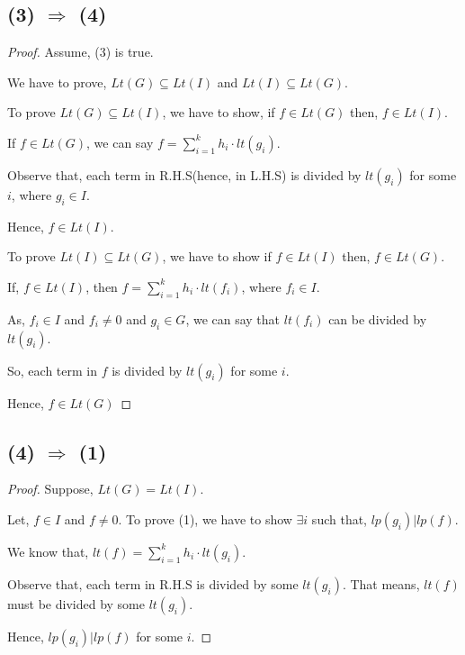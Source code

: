 \subsection{(3) $\Longrightarrow$ (4)}
\begin{proof}
Assume, (3) is true.

We have to prove, $Lt(G) \subseteq Lt(I)$ and $Lt(I) \subseteq Lt(G)$.

To prove $Lt(G) \subseteq Lt(I)$, we have to show, if $f \in Lt(G)$ then, $f \in Lt(I)$.

If $f \in Lt(G)$, we can say $f = \sum_{i =1}^{k} h_i \cdot lt(g_i)$.

Observe that, each term in R.H.S(hence, in L.H.S) is divided by $lt(g_i)$ for some $i$, where $g_i \in I$.

Hence, $f \in Lt(I)$.

To prove $Lt(I) \subseteq Lt(G)$, we have to show if $f \in Lt(I)$ then, $f \in Lt(G)$.

If, $f \in Lt(I)$, then $f = \sum_{i =1}^{k} h_i \cdot lt(f_i)$, where $f_i \in I$.

As, $f_i \in I$ and $f_i \neq 0$ and $g_i \in G$, we can say that $lt(f_i)$ can be divided by $lt(g_i)$.

So, each term in $f$ is divided by $lt(g_i)$ for some $i$.

Hence, $f \in Lt(G)$

\end{proof}

\subsection{(4) $\Longrightarrow$ (1)}
\begin{proof}

Suppose, $Lt(G) = Lt(I)$.

Let, $f \in I$ and $f \neq 0$. To prove (1), we have to show $\exists i$ such that, $lp(g_i)|lp(f)$.

We know that, $lt(f) = \sum_{i =1}^{k} h_i \cdot lt(g_i)$.

Observe that, each term in R.H.S is divided by some $lt(g_i)$. That means, $lt(f)$ must be divided by some $lt(g_i)$.

Hence, $lp(g_i)|lp(f)$ for some $i$.
\end{proof}

